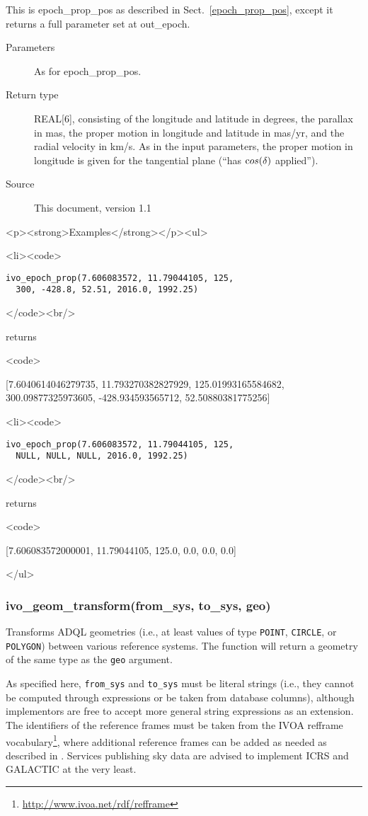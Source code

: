 \documentclass[11pt,a4paper]{ivoa}
\newenvironment{examples}%
{\begin{html}<p><strong>Examples</strong></p><ul>\end{html}%
  \def\example{\begin{html}<li><code>\end{html}}%
  \def\becomes{\begin{html}</code><br/>\end{html} returns
    \begin{html}<code>\end{html}}%
  \def\done##1.{\begin{html}</code> <span class="explanation">\end{html}
    ##1
    \begin{html}</span></li>\end{html}}}%
{\begin{html}</ul>\end{html}}
\begin{document}
This is epoch\_prop\_pos as described in Sect.~\ref{epoch_prop_pos},
except it returns a full parameter set at out\_epoch.

\begin{description}
\item[Parameters]
  As for epoch\_prop\_pos.

\item[Return type] REAL[6], consisting of the longitude and latitude in
degrees, the parallax in mas, the proper motion in longitude and
latitude in mas/yr, and the radial velocity in km/s.  As in the input
parameters, the proper motion in longitude is given for the tangential
plane (``has ${\textrm cos}(\delta)$ applied'').


\item[Source] This document, version 1.1
\end{description}

\begin{examples}
\example \begin{lstlisting}
ivo_epoch_prop(7.606083572, 11.79044105, 125,
  300, -428.8, 52.51, 2016.0, 1992.25)
\end{lstlisting}
\becomes [7.6040614046279735, 11.793270382827929, 125.01993165584682,\\
300.09877325973605, -428.934593565712, 52.50880381775256]
\example \begin{lstlisting}
ivo_epoch_prop(7.606083572, 11.79044105, 125,
  NULL, NULL, NULL, 2016.0, 1992.25)
\end{lstlisting}
\becomes [7.606083572000001, 11.79044105, 125.0, 0.0, 0.0, 0.0]
\end{examples}

\subsubsection{ivo\_geom\_transform(from\_sys, to\_sys, geo)}

Transforms ADQL geometries (i.e., at least values of type \verb|POINT|,
\verb|CIRCLE|, or \verb|POLYGON|) between various reference systems. The
function will return a geometry of the same type as the \verb|geo|
argument.

As specified here, \verb|from_sys| and \verb|to_sys| must be literal
strings (i.e., they cannot be computed through expressions or be taken
from database columns), although implementors are free to accept more
general string expressions as an extension.  The identifiers of the
reference frames must be taken from the IVOA refframe
vocabulary\footnote{\url{http://www.ivoa.net/rdf/refframe}}, where
additional reference frames can be added as needed as described in
\citet{2023ivoa.spec.0206D}.  Services publishing sky data are advised
to implement ICRS and GALACTIC at the very least.
\end{document}
